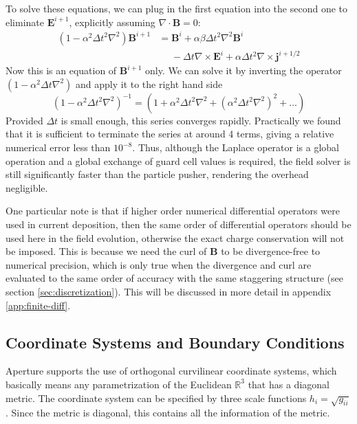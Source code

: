 To solve these equations, we can plug in the first equation into the second one
to eliminate $\mathbf{E}^{i+1}$, explicitly assuming $\nabla\cdot \mathbf{B} =
0$:
\begin{equation}
  \begin{split}
    (1 - \alpha^2\Delta t^2\nabla^2)\mathbf{B}^{i+1} &= \mathbf{B}^i + \alpha\beta \Delta t^2\nabla^2 \mathbf{B}^i \\
    &\phantom{=} -\Delta t\nabla\times \mathbf{E}^i + \alpha\Delta t^2\nabla\times \mathbf{j}^{i + 1/2}
  \end{split}
\end{equation}
Now this is an equation of $\mathbf{B}^{i+1}$ only. We can solve it by inverting
the operator $(1 - \alpha^2\Delta t\nabla^2)$ and apply it to the right hand side
\begin{equation}
  \label{eq:field-relax}
  (1 - \alpha^2\Delta t^2\nabla^2)^{-1} = (1 + \alpha^2\Delta t^2\nabla^2 + (\alpha^2\Delta t^2\nabla^2)^2 + \dots)
\end{equation}
Provided $\Delta t$ is small enough, this series converges rapidly. Practically
we found that it is sufficient to terminate the series at around 4 terms, giving
a relative numerical error less than $10^{-8}$. Thus, although the Laplace
operator is a global operation and a global exchange of guard cell values is
required, the field solver is still significantly faster than the particle
pusher, rendering the overhead negligible.

One particular note is that if higher order numerical differential operators
were used in current deposition, then the same order of differential operators
should be used here in the field evolution, otherwise the exact charge
conservation will not be imposed. This is because we need the curl of
$\mathbf{B}$ to be divergence-free to numerical precision, which is only true
when the divergence and curl are evaluated to the same order of accuracy with
the same staggering structure (see section \ref{sec:discretization}). This will
be discussed in more detail in appendix \ref{app:finite-diff}.

\subsection{Coordinate Systems and Boundary Conditions}
\label{sec:coord-syst-sing}

Aperture supports the use of orthogonal curvilinear coordinate systems, which
basically means any parametrization of the Euclidean $\mathbb{R}^{3}$ that has a
diagonal metric. The coordinate system can be specified by three scale functions
$h_{i} = \sqrt{g_{ii}}$. Since the metric is diagonal, this contains all the
information of the metric.

